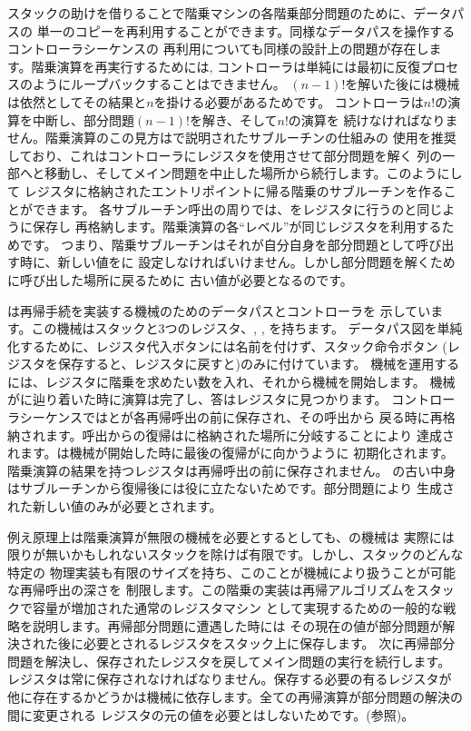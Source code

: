 スタックの助けを借りることで階乗マシンの各階乗部分問題のために、データパスの
単一のコピーを再利用することができます。同様なデータパスを操作するコントローラシーケンスの
再利用についても同様の設計上の問題が存在します。階乗演算を再実行するためには,
コントローラは単純には最初に反復プロセスのようにループバックすることはできません。
\( (n - 1)! \)を解いた後には機械は依然としてその結果と\( n \)を掛ける必要があるためです。
コントローラは\( n! \)の演算を中断し、部分問題\( (n - 1)! \)を解き、そして\( n! \)の演算を
続けなければなりません。階乗演算のこの見方はで説明されたサブルーチンの仕組みの
使用を推奨しており、これはコントローラにレジスタを使用させて部分問題を解く
列の一部へと移動し、そしてメイン問題を中止した場所から続行します。このようにして
レジスタに格納されたエントリポイントに帰る階乗のサブルーチンを作ることができます。
各サブルーチン呼出の周りでは、をレジスタに行うのと同じように保存し
再格納します。階乗演算の各``レベル''が同じレジスタを利用するためです。
つまり、階乗サブルーチンはそれが自分自身を部分問題として呼び出す時に、新しい値をに
設定しなければいけません。しかし部分問題を解くために呼び出した場所に戻るために
古い値が必要となるのです。

は再帰手続を実装する機械のためのデータパスとコントローラを
示しています。この機械はスタックと3つのレジスタ、, , を持ちます。
データパス図を単純化するために、レジスタ代入ボタンには名前を付けず、スタック命令ボタン
(レジスタを保存すると、レジスタに戻すと)のみに付けています。
機械を運用するには、レジスタに階乗を求めたい数を入れ、それから機械を開始します。
機械がに辿り着いた時に演算は完了し、答はレジスタに見つかります。
コントローラシーケンスではとが各再帰呼出の前に保存され、その呼出から
戻る時に再格納されます。呼出からの復帰はに格納された場所に分岐することにより
達成されます。は機械が開始した時に最後の復帰がに向かうように
初期化されます。階乗演算の結果を持つレジスタは再帰呼出の前に保存されません。
の古い中身はサブルーチンから復帰後には役に立たないためです。部分問題により
生成された新しい値のみが必要とされます。

例え原理上は階乗演算が無限の機械を必要とするとしても、の機械は
実際には限りが無いかもしれないスタックを除けば有限です。しかし、スタックのどんな特定の
物理実装も有限のサイズを持ち、このことが機械により扱うことが可能な再帰呼出の深さを
制限します。この階乗の実装は再帰アルゴリズムをスタックで容量が増加された通常のレジスタマシン
として実現するための一般的な戦略を説明します。再帰部分問題に遭遇した時には
その現在の値が部分問題が解決された後に必要とされるレジスタをスタック上に保存します。
次に再帰部分問題を解決し、保存されたレジスタを戻してメイン問題の実行を続行します。
レジスタは常に保存されなければなりません。保存する必要の有るレジスタが
他に存在するかどうかは機械に依存します。全ての再帰演算が部分問題の解決の間に変更される
レジスタの元の値を必要とはしないためです。(参照)。

